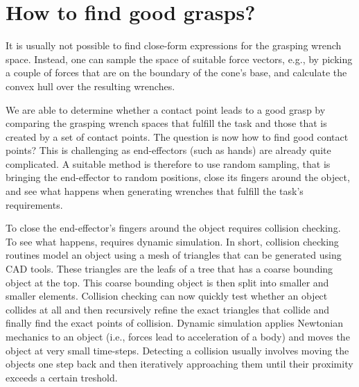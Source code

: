 

\section{How to find good grasps?}

It is usually not possible to find close-form expressions for the grasping wrench space. Instead, one can sample the space of suitable force vectors, e.g., by picking a couple of forces that are on the boundary of the cone's base, and calculate the convex hull over the resulting wrenches.



We are able to determine whether a contact point leads to a good grasp by comparing the grasping wrench spaces that fulfill the task and those that is created by a set of contact points. The question is now how to find good contact points? This is challenging as end-effectors (such as hands) are already quite complicated. A suitable method is therefore to use random sampling, that is bringing the end-effector to random positions, close its fingers around the object, and see what happens when generating wrenches that fulfill the task's requirements.

To close the end-effector's fingers around the object requires collision checking. To see what happens, requires dynamic simulation. In short, collision checking routines model an object using a mesh of triangles that can be generated using CAD tools. These triangles are the leafs of a tree that has a coarse bounding object at the top. This coarse bounding object is then split into smaller and smaller elements. Collision checking can now quickly test whether an object collides at all and then recursively refine the exact triangles that collide and finally find the exact points of collision. Dynamic simulation applies Newtonian mechanics to an object (i.e., forces lead to acceleration of a body) and moves the object at very small time-steps. Detecting a collision usually involves moving the objects one step back and then iteratively approaching them until their proximity exceeds a certain treshold.

